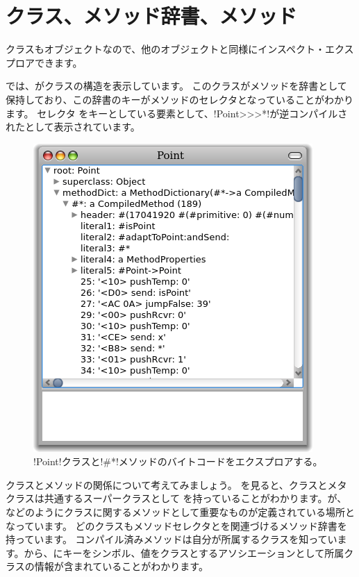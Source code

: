 \documentclass[a4paper,10pt,twoside]{book}
\begin{document}
\section{クラス、メソッド辞書、メソッド}

クラスもオブジェクトなので、他のオブジェクトと同様にインスペクト・エクスプロアできます。


では、がクラスの構造を表示しています。
このクラスがメソッドを辞書として保持しており、この辞書のキーがメソッドのセレクタとなっていることがわかります。
セレクタ \ct{#*} をキーとしている要素として、\ct!Point>>>*!が逆コンパイルされたとして表示されています。

\begin{figure}[ht]\centering
	\includegraphics[width=.5\linewidth]{CompiledMethod}
	\caption{\ct!Point!クラスと\ct!\#*!メソッドのバイトコードをエクスプロアする。}
\end{figure}

クラスとメソッドの関係について考えてみましょう。
を見ると、クラスとメタクラスは共通するスーパークラスとして  を持っていることがわかります。が、などのようにクラスに関するメソッドとして重要なものが定義されている場所となっています。
どのクラスもメソッドセレクタとを関連づけるメソッド辞書を持っています。
コンパイル済みメソッドは自分が所属するクラスを知っています。から、にキーをシンボル、値をクラスとするアソシエーションとして所属クラスの情報が含まれていることがわかります。
\end{document}
